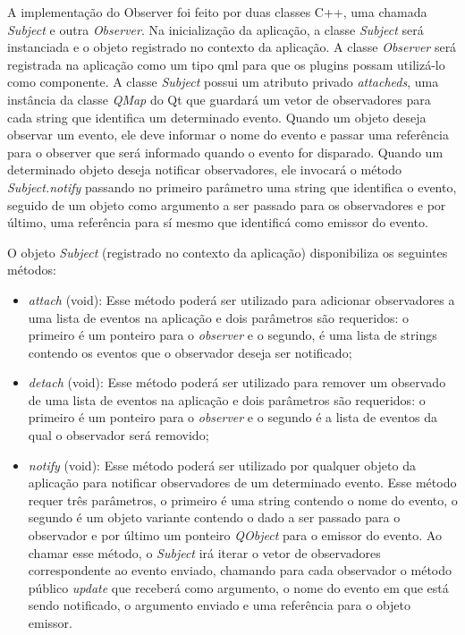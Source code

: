 A implementação do Observer foi feito por duas classes C++, uma chamada \textit{Subject} e outra \textit{Observer}. Na inicialização da aplicação, a classe \textit{Subject} será instanciada e o objeto registrado no contexto da aplicação. A classe \textit{Observer} será registrada na aplicação como um tipo qml para que os plugins possam utilizá-lo como componente. A classe \textit{Subject} possui um atributo privado \textit{attacheds}, uma instância da classe \textit{QMap} do Qt que guardará um vetor de observadores para cada string que identifica um determinado evento. Quando um objeto deseja observar um evento, ele deve informar o nome do evento e passar uma referência para o observer que será informado quando o evento for disparado. Quando um determinado objeto deseja notificar observadores, ele invocará o método \textit{Subject.notify} passando no primeiro parâmetro uma string que identifica o evento, seguido de um objeto como argumento a ser passado para os observadores e por último, uma referência para sí mesmo que identificá como emissor do evento.

O objeto \textit{Subject} (registrado no contexto da aplicação) disponibiliza os seguintes métodos:

\begin{itemize}
	\item \textit{attach} (void): Esse método poderá ser utilizado para adicionar observadores a uma lista de eventos na aplicação e dois parâmetros são requeridos: o primeiro é um ponteiro para o \textit{observer} e o segundo, é uma lista de strings contendo os eventos que o observador deseja ser notificado;

	\item \textit{detach} (void): Esse método poderá ser utilizado para remover um observado de uma lista de eventos na aplicação e dois parâmetros são requeridos: o primeiro é um ponteiro para o \textit{observer} e o segundo é a lista de eventos da qual o observador será removido;

	\item \textit{notify} (void): Esse método poderá ser utilizado por qualquer objeto da aplicação para notificar observadores de um determinado evento. Esse método requer três parâmetros, o primeiro é uma string contendo o nome do evento, o segundo é um objeto variante contendo o dado a ser passado para o observador e por último um ponteiro \textit{QObject} para o emissor do evento. Ao chamar esse método, o \textit{Subject} irá iterar o vetor de observadores correspondente ao evento enviado, chamando para cada observador o método público \textit{update} que receberá como argumento, o nome do evento em que está sendo notificado, o argumento enviado e uma referência para o objeto emissor.
\end{itemize}

